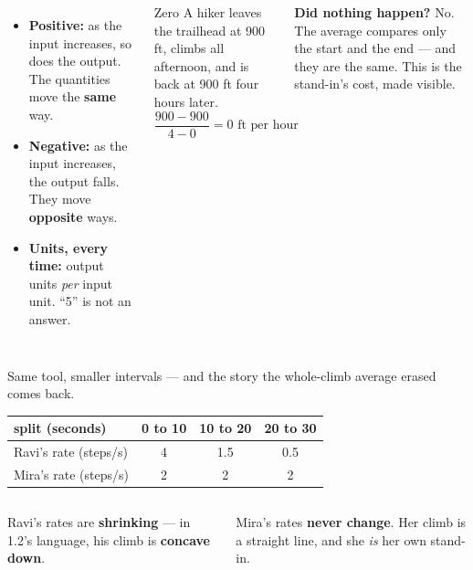 \documentclass[aspectratio=169, 11pt]{beamer}
\begin{document}
\begin{frame}[t, plain]

  \begin{columns}[T]
      \begin{itemize}\setlength{\itemsep}{7pt}
        \item \textbf{Positive:} as the input increases, so does the output.
              The quantities move the \textbf{same} way.
        \item \textbf{Negative:} as the input increases, the output falls.
              They move \textbf{opposite} ways.
        \item \textbf{Units, every time:} output units \textit{per} input
              unit. ``5'' is not an answer.
      \end{itemize}

      \begin{block}{Zero}
        A hiker leaves the trailhead at 900 ft, climbs all afternoon, and is
        back at 900 ft four hours later.
        \[
          \frac{900 - 900}{4 - 0} = 0 \text{ ft per hour}
        \]
      \end{block}

      \medskip
      \textbf{Did nothing happen?} No. The average compares only the start and
      the end --- and they are the same. This is the stand-in's cost, made
      visible.
  \end{columns}
\end{frame}

\begin{frame}[t, plain]

  Same tool, smaller intervals --- and the story the whole-climb average
  erased comes back.

  \medskip
  \begin{center}
  \renewcommand{\arraystretch}{1.4}
  \begin{tabular}{|l|c|c|c|}
  \hline
  \textbf{split (seconds)} & \textbf{0 to 10} & \textbf{10 to 20} & \textbf{20 to 30} \\
  \hline
  Ravi's rate (steps/s) & 4 & 1.5 & 0.5 \\
  \hline
  Mira's rate (steps/s) & 2 & 2 & 2 \\
  \hline
  \end{tabular}
  \end{center}

  \medskip
  \begin{columns}[T]
      Ravi's rates are \textbf{shrinking} --- in 1.2's language, his climb is
      \textbf{concave down}.

      Mira's rates \textbf{never change}. Her climb is a straight line, and
      she \textit{is} her own stand-in.
  \end{columns}
\end{frame}
\end{document}
